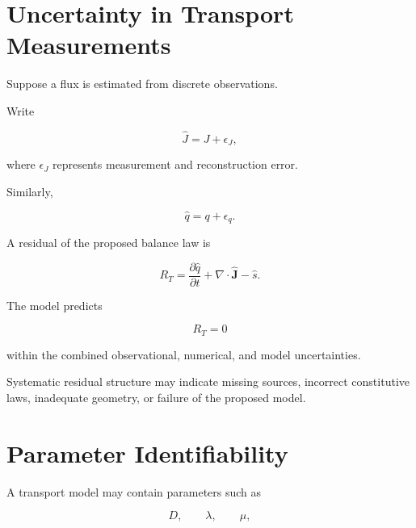 \documentclass[12pt,oneside]{book}
\begin{document}
\section{Uncertainty in Transport Measurements}
\label{sec:transport-uncertainty}

Suppose a flux is estimated from discrete observations.

Write

\begin{equation}
    \widehat{J}
    =
    J
    +
    \epsilon_J,
    \label{eq:measured-flux}
\end{equation}

where \(\epsilon_J\) represents measurement and reconstruction
error.

Similarly,

\begin{equation}
    \widehat{q}
    =
    q
    +
    \epsilon_q.
\end{equation}

A residual of the proposed balance law is

\begin{equation}
    R_T
    =
    \frac{\partial\widehat{q}}{\partial t}
    +
    \nabla\cdot\widehat{\mathbf{J}}
    -
    \widehat{s}.
    \label{eq:transport-residual}
\end{equation}

The model predicts

\begin{equation}
    R_T
    =
    0
\end{equation}

within the combined observational, numerical, and model
uncertainties.

Systematic residual structure may indicate missing sources,
incorrect constitutive laws, inadequate geometry, or failure of
the proposed model.


\section{Parameter Identifiability}
\label{sec:transport-identifiability}

A transport model may contain parameters such as

\begin{equation}
    D,
    \qquad
    \lambda,
    \qquad
    \mu,
\end{equation}
\end{document}

